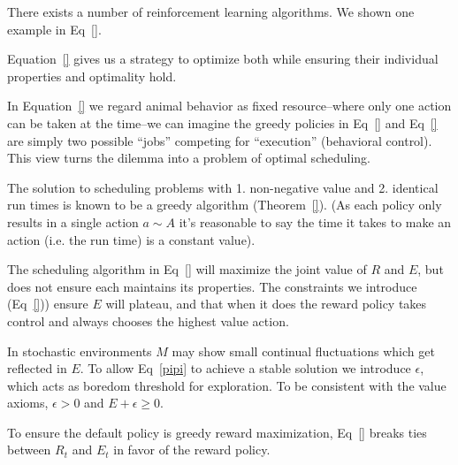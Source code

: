 \documentclass[9pt,twocolumn,twoside]{pnas-new}
\begin{document}
There exists a number of reinforcement learning algorithms. We shown one example in Eq~\ref{}. 

Equation~\ref{} gives us a strategy to optimize both while ensuring their individual properties and optimality hold. 

In Equation~\ref{} we regard animal behavior as fixed resource--where only one action can be taken at the time--we can imagine the greedy policies in Eq~\ref{} and Eq~\ref{} are simply two possible ``jobs'' competing for ``execution'' (behavioral control). This view turns the dilemma into a problem of optimal scheduling. 


The solution to scheduling problems with 1. non-negative value and 2. identical run times is known to be a greedy algorithm (Theorem~\ref{}). (As each policy only results in a single action $a \sim A$ it's reasonable to say the time it takes to make an action (i.e. the run time) is a constant value).

The scheduling algorithm in Eq~\ref{} will maximize the joint value of $R$ and $E$, but does not ensure each maintains its properties. The constraints we introduce (Eq~\ref{})) ensure $E$ will plateau, and that when it does the reward policy takes control and always chooses the highest value action. 

In stochastic environments $M$ may show small continual fluctuations which get reflected in $E$. To allow Eq~\ref{pipi} to achieve a stable solution we introduce $\epsilon$, which acts as boredom threshold for exploration. To be consistent with the value axioms, $\epsilon > 0$ and $E + \epsilon \geq 0$. 

To ensure the default policy is greedy reward maximization, Eq~\ref{} breaks ties between $R_t$ and $E_t$ in favor of the reward policy.

\end{document}

